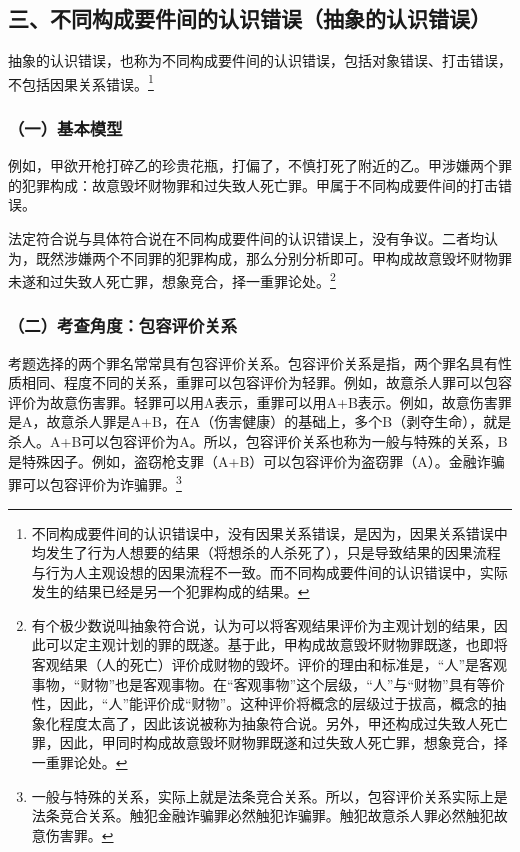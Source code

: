 \subsection*{三、不同构成要件间的认识错误（抽象的认识错误）}

抽象的认识错误，也称为不同构成要件间的认识错误，包括对象错误、打击错误，不包括因果关系错误。\footnote{不同构成要件间的认识错误中，没有因果关系错误，是因为，因果关系错误中均发生了行为人想要的结果（将想杀的人杀死了），只是导致结果的因果流程与行为人主观设想的因果流程不一致。而不同构成要件间的认识错误中，实际发生的结果已经是另一个犯罪构成的结果。}

\subsubsection*{（一）基本模型}

例如，甲欲开枪打碎乙的珍贵花瓶，打偏了，不慎打死了附近的乙。甲涉嫌两个罪的犯罪构成：故意毁坏财物罪和过失致人死亡罪。甲属于不同构成要件间的打击错误。

法定符合说与具体符合说在不同构成要件间的认识错误上，没有争议。二者均认为，既然涉嫌两个不同罪的犯罪构成，那么分别分析即可。甲构成故意毁坏财物罪未遂和过失致人死亡罪，想象竞合，择一重罪论处。\footnote{有个极少数说叫抽象符合说，认为可以将客观结果评价为主观计划的结果，因此可以定主观计划的罪的既遂。基于此，甲构成故意毁坏财物罪既遂，也即将客观结果（人的死亡）评价成财物的毁坏。评价的理由和标准是，“人”是客观事物，“财物”也是客观事物。在“客观事物”这个层级，“人”与“财物”具有等价性，因此，“人”能评价成“财物”。这种评价将概念的层级过于拔高，概念的抽象化程度太高了，因此该说被称为抽象符合说。另外，甲还构成过失致人死亡罪，因此，甲同时构成故意毁坏财物罪既遂和过失致人死亡罪，想象竞合，择一重罪论处。}

\subsubsection*{（二）考查角度：包容评价关系}

考题选择的两个罪名常常具有包容评价关系。包容评价关系是指，两个罪名具有性质相同、程度不同的关系，重罪可以包容评价为轻罪。例如，故意杀人罪可以包容评价为故意伤害罪。轻罪可以用A表示，重罪可以用A+B表示。例如，故意伤害罪是A，故意杀人罪是A+B，在A（伤害健康）的基础上，多个B（剥夺生命），就是杀人。A+B可以包容评价为A。所以，包容评价关系也称为一般与特殊的关系，B是特殊因子。例如，盗窃枪支罪（A+B）可以包容评价为盗窃罪（A）。金融诈骗罪可以包容评价为诈骗罪。\footnote{一般与特殊的关系，实际上就是法条竞合关系。所以，包容评价关系实际上是法条竞合关系。触犯金融诈骗罪必然触犯诈骗罪。触犯故意杀人罪必然触犯故意伤害罪。}

